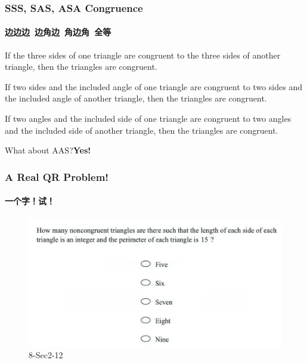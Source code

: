 \documentclass[
	11pt, %
]{beamer}
\begin{document}

\begin{frame}
	\frametitle{SSS, SAS, ASA Congruence} %
	\framesubtitle{边边边\ 边角边\ 角边角\ 全等}
			\begin{theorem}
				If the three sides of one triangle are congruent to the three
sides of another triangle, then the triangles are congruent.
			\end{theorem}

			\begin{theorem}
				If two sides and the included angle of one triangle are
congruent to two sides and the included angle of another triangle,
then the triangles are congruent.
			\end{theorem}

			\begin{theorem}
				If two angles and the included side of one triangle are
congruent to two angles and the included side of another triangle,
then the triangles are congruent.
			\end{theorem}
What about AAS?\pause \alert{\textbf{Yes!}}
\end{frame}


\begin{frame}
	\frametitle{A Real QR Problem!}
	\framesubtitle{一个字！试！}
	\begin{figure}
		\includegraphics[width=\linewidth]{Triangle_Inequalities_Example_Question1.png}
		\caption{8-Sec2-12}
	\end{figure}
\end{frame}

\end{document}
